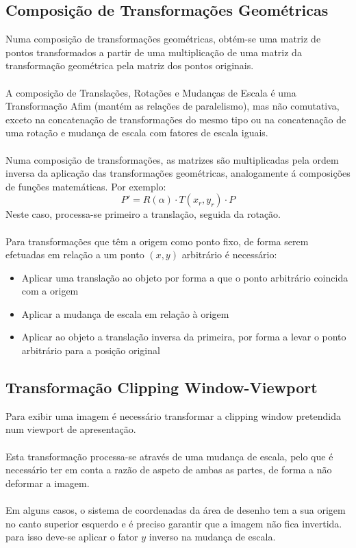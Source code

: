 \documentclass[10pt,a4paper]{report}
\begin{document}
\subsection{Composição de Transformações Geométricas}
Numa composição de transformações geométricas, obtém-se uma matriz de pontos transformados a partir de uma multiplicação de uma matriz da transformação geométrica pela matriz dos pontos originais.\\
\\
A composição de Translações, Rotações e Mudanças de Escala é uma Transformação Afim (mantém as relações de paralelismo), mas não comutativa, exceto na concatenação de transformações do mesmo tipo ou na concatenação de uma rotação e mudança de escala com fatores de escala iguais.\\
\\
Numa composição de transformações, as matrizes são multiplicadas pela ordem inversa da aplicação das transformações geométricas, analogamente á composições de funções matemáticas. Por exemplo:
$$
P' =  R(\alpha)\cdot T(x_r,y_r)\cdot P
$$
Neste caso, processa-se primeiro a translação, seguida da rotação.\\
\\
Para transformações que têm a origem como ponto fixo, de forma serem efetuadas em relação a um ponto $(x,y)$ arbitrário é necessário:
\begin{itemize}
\item Aplicar uma translação ao objeto por forma a que o ponto arbitrário coincida com a origem
\item Aplicar a mudança de escala em relação à origem
\item Aplicar ao objeto a translação inversa da primeira, por forma a levar o ponto arbitrário para a posição original
\end{itemize}
\subsection{Transformação Clipping Window-Viewport}
Para exibir uma imagem é necessário transformar a clipping window pretendida num viewport de apresentação.\\
\\
Esta transformação processa-se através de uma mudança de escala, pelo que é necessário ter em conta a razão de aspeto de ambas as partes, de forma a não deformar a imagem.\\
\\
Em alguns casos, o sistema de coordenadas da área de desenho tem a sua origem no canto superior esquerdo e é preciso garantir que a imagem não fica invertida. para isso deve-se aplicar o fator $y$ inverso na mudança de escala.
\end{document}
